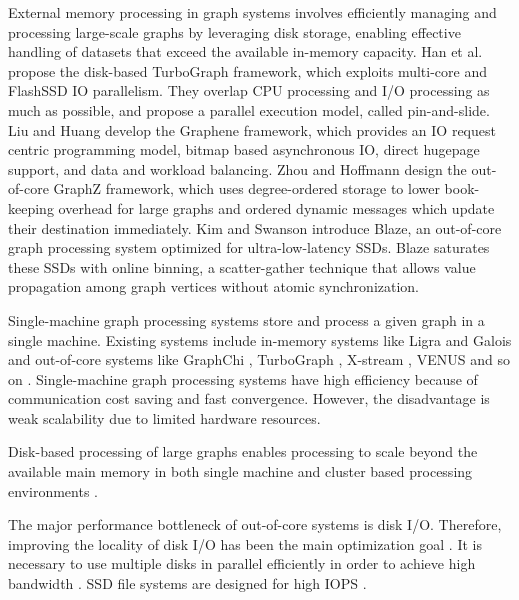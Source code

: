 External memory processing in graph systems involves efficiently managing and processing large-scale graphs by leveraging disk storage, enabling effective handling of datasets that exceed the available in-memory capacity. Han et al. \cite{han2013turbograph} propose the disk-based TurboGraph framework, which exploits multi-core and FlashSSD IO parallelism. They overlap CPU processing and I/O processing as much as possible, and propose a parallel execution model, called pin-and-slide. Liu and Huang \cite{liu2017graphene} develop the Graphene framework, which provides an IO request centric programming model, bitmap based asynchronous IO, direct hugepage support, and data and workload balancing. Zhou and Hoffmann \cite{zhou2018graphz} design the out-of-core GraphZ framework, which uses degree-ordered storage to lower book-keeping overhead for large graphs and ordered dynamic messages which update their destination immediately. Kim and Swanson \cite{kim2022blaze} introduce Blaze, an out-of-core graph processing system optimized for ultra-low-latency SSDs. Blaze saturates these SSDs with online binning, a scatter-gather technique that allows value propagation among graph vertices without atomic synchronization.




Single-machine graph processing systems store and process a given graph in a single machine. Existing systems include in-memory systems like Ligra  \cite{shun2013ligra} and Galois \cite{kulkarni2007optimistic, nguyen2013lightweight} and out-of-core systems like GraphChi \cite{kyrola2012graphchi}, TurboGraph \cite{han2013turbograph}, X-stream \cite{roy2013x}, VENUS \cite{cheng2015venus} and so on \cite{chi2016nxgraph, vora2016load, wang2013asynchronous}. Single-machine graph processing systems have high efficiency because of communication cost saving and fast convergence. However, the disadvantage is weak scalability due to limited hardware resources.

Disk-based processing of large graphs enables processing to scale beyond the available main memory in both single machine \cite{ai2017squeezing, han2013turbograph, jun2018grafboost, kyrola2012graphchi, lin2014mmap, ma2017garaph, maass2017mosaic, roy2013x, zhang2018wonderland, zheng2015flashgraph, zhu2015gridgraph} and cluster based \cite{roy2015chaos} processing environments \cite{vora2019lumos}.

The major performance bottleneck of out-of-core systems is disk I/O. Therefore, improving the locality of disk I/O has been the main optimization goal \cite{ai2018clip}. It is necessary to use multiple disks in parallel efficiently in order to achieve high bandwidth \cite{sanders2003fast}. SSD file systems are designed for high IOPS \cite{zheng2015flashgraph}.

